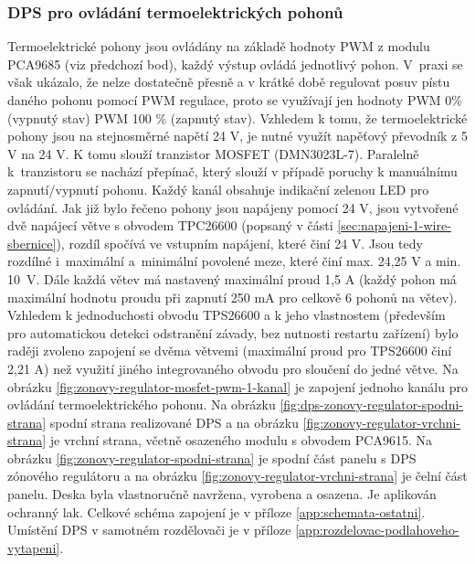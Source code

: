 \subsubsection{DPS pro ovládání termoelektrických pohonů}
Termoelektrické pohony jsou ovládány na základě hodnoty PWM z modulu PCA9685 (viz předchozí bod), každý výstup ovládá jednotlivý pohon. V~praxi se však ukázalo, že nelze dostatečně přesně a v krátké době regulovat posuv pístu daného pohonu pomocí PWM regulace, proto se využívají jen hodnoty PWM 0\% (vypnutý stav) PWM 100 \% (zapnutý stav). Vzhledem k tomu, že termoelektrické pohony jsou na stejnosměrné napětí 24 V, je nutné využít napěťový převodník z 5 V na 24 V. K tomu slouží tranzistor MOSFET (DMN3023L-7). Paralelně k~tranzistoru se nachází přepínač, který slouží v případě poruchy k manuálnímu zapnutí/vypnutí pohonu.  Každý kanál obsahuje indikační zelenou LED pro ovládání. Jak již bylo řečeno pohony jsou napájeny pomocí 24 V, jsou vytvořené dvě napájecí větve s obvodem TPC26600 (popsaný v části \ref{sec:napajeni-1-wire-sbernice}), rozdíl spočívá ve vstupním napájení, které činí 24 V. Jsou tedy rozdílné i~maximální a~minimální povolené meze, které činí max. 24,25 V a min. 10~V. Dále každá větev má nastavený maximální proud 1,5 A (každý pohon má maximální hodnotu proudu při zapnutí 250 mA pro celkově 6 pohonů na větev). Vzhledem k jednoduchosti obvodu TPS26600 a k jeho vlastnostem (především pro automatickou detekci odstranění závady, bez nutnosti restartu zařízení) bylo raději zvoleno zapojení se dvěma větvemi (maximální proud pro TPS26600 činí 2,21 A) než využití jiného integrovaného obvodu pro sloučení do jedné větve. Na obrázku \ref{fig:zonovy-regulator-mosfet-pwm-1-kanal} je zapojení jednoho kanálu pro ovládání termoelektrického pohonu.  Na obrázku \ref{fig:dps-zonovy-regulator-spodni-strana} spodní strana realizované DPS a na obrázku \ref{fig:zonovy-regulator-vrchni-strana} je vrchní strana, včetně osazeného modulu s obvodem PCA9615. Na obrázku \ref{fig:zonovy-regulator-spodni-strana} je spodní část panelu s DPS zónového regulátoru a na obrázku \ref{fig:zonovy-regulator-vrchni-strana} je čelní část panelu. Deska byla vlastnoručně navržena, vyrobena a osazena. Je aplikován ochranný lak. Celkové schéma zapojení je v příloze \ref{app:schemata-ostatni}. Umístění DPS v samotném rozdělovači je v příloze \ref{app:rozdelovac-podlahoveho-vytapeni}.


